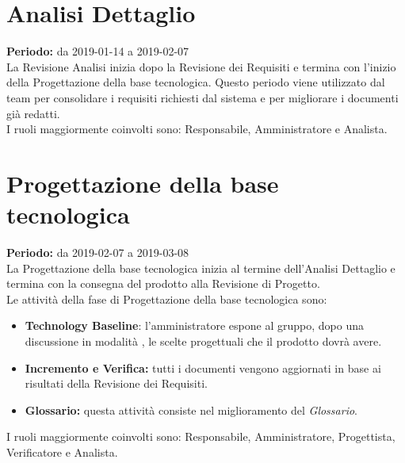 \section{Analisi Dettaglio}
\textbf{Periodo:} da 2019-01-14 a 2019-02-07\\
La Revisione Analisi inizia dopo la Revisione dei Requisiti e termina con l’inizio della Progettazione della base tecnologica. Questo periodo viene utilizzato dal team per consolidare i requisiti richiesti dal sistema e per migliorare i documenti già redatti.\\I ruoli maggiormente coinvolti sono: Responsabile, Amministratore e Analista.

\section{Progettazione della base tecnologica}
\textbf{Periodo:} da 2019-02-07 a 2019-03-08\\
La Progettazione della base tecnologica inizia al termine dell’Analisi Dettaglio e termina con la consegna del prodotto alla Revisione di Progetto.\\
Le attività della fase di Progettazione della base tecnologica sono:
\begin{itemize}
    \item \textbf{Technology Baseline}: l'amministratore espone al gruppo, dopo una discussione in modalità , le scelte progettuali che il prodotto dovrà avere.
    \item \textbf{Incremento e Verifica:} tutti i documenti vengono aggiornati in base ai risultati della Revisione dei Requisiti.
    \item \textbf{Glossario:} questa attività consiste nel miglioramento del \textit{Glossario}.
\end{itemize}
I ruoli maggiormente coinvolti sono: Responsabile, Amministratore, Progettista, Verificatore e Analista.

